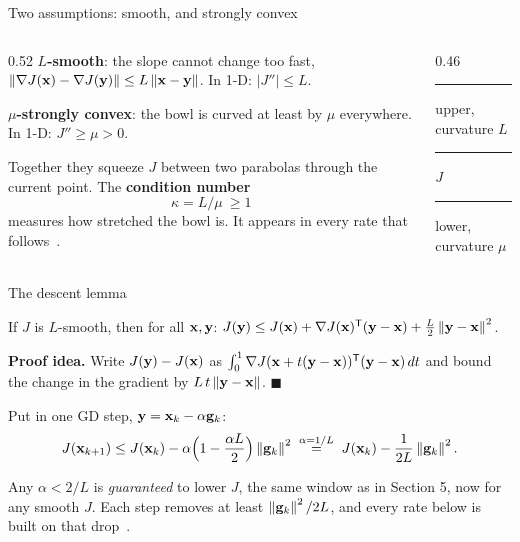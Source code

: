 \begin{frame}{Two assumptions: smooth, and strongly convex}
  \begin{columns}[T]
    \begin{column}{0.52\textwidth}
      \small
      \textbf{$L$-smooth}: the slope cannot change too fast,
      $\left\lVert \nabla J(\mathbf{x}) - \nabla J(\mathbf{y}) \right\rVert \le L\left\lVert \mathbf{x} - \mathbf{y} \right\rVert$. In 1-D: $|J''| \le L$.

      \vspace{3pt}
      \textbf{$\mu$-strongly convex}: the bowl is curved at least by $\mu$ everywhere. In 1-D: $J'' \ge \mu > 0$.

      \vspace{3pt}
      Together they squeeze $J$ between two parabolas through the current point. The
      \textbf{condition number}
      \[
        \kappa = L/\mu \ \ge 1
      \]
      measures how stretched the bowl is. It appears in every rate that follows~\cite{nesterov2018,boyd2004}.
    \end{column}
    \begin{column}{0.46\textwidth}
      \centering
      

      \scriptsize
      \textcolor{mRed}{\rule[2pt]{10pt}{1.1pt}} upper, curvature $L$ \quad
      \textcolor{mInk}{\rule[2pt]{10pt}{1.8pt}} $J$ \quad
      \textcolor{mBlue}{\rule[2pt]{10pt}{1.1pt}} lower, curvature $\mu$
    \end{column}
  \end{columns}
\end{frame}

\begin{frame}{The descent lemma}
  \begin{thmbox}
    If $J$ is $L$-smooth, then for all $\mathbf{x}, \mathbf{y}$:\quad
    $J(\mathbf{y}) \le J(\mathbf{x}) + \nabla J(\mathbf{x})^{\mathsf T}(\mathbf{y} - \mathbf{x}) + \tfrac L2\left\lVert \mathbf{y} - \mathbf{x} \right\rVert^2$.
  \end{thmbox}
  \small
  \textbf{Proof idea.} Write $J(\mathbf{y}) - J(\mathbf{x})$ as $\int_0^1 \nabla J(\mathbf{x} + t(\mathbf{y} - \mathbf{x}))^{\mathsf T}(\mathbf{y} - \mathbf{x})\,dt$ and bound the change in
  the gradient by $L\,t\left\lVert \mathbf{y} - \mathbf{x} \right\rVert$. $\blacksquare$

  \vspace{4pt}
  Put in one GD step, $\mathbf{y} = \mathbf{x}_k - \alpha\mathbf{g}_k$:
  \[
    J(\mathbf{x}_{k+1}) \le J(\mathbf{x}_k) - \alpha\Bigl(1 - \frac{\alpha L}{2}\Bigr)\left\lVert \mathbf{g}_k \right\rVert^2
    \;\overset{\alpha = 1/L}{=}\; J(\mathbf{x}_k) - \frac{1}{2L}\left\lVert \mathbf{g}_k \right\rVert^2 .
  \]
  \begin{keybox}
    \small Any $\alpha < 2/L$ is \emph{guaranteed} to lower $J$, the same window as in Section 5, now for any smooth $J$.
    Each step removes at least $\left\lVert \mathbf{g}_k \right\rVert^2/2L$, and every rate below is built on that drop~\cite{bubeck2015}.
  \end{keybox}
\end{frame}

